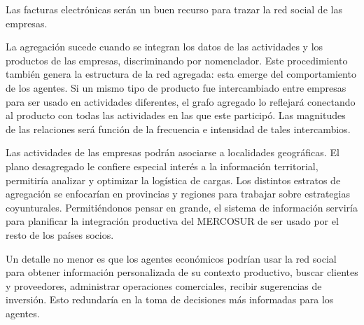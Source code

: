 \documentclass[a4paper]{report}
\begin{document}
Las facturas electrónicas serán un buen recurso para trazar la red social de las empresas.

La agregación sucede cuando se integran los datos de las actividades y los productos de las empresas, discriminando por nomenclador. Este procedimiento también genera la estructura de la red agregada: esta emerge del comportamiento de los agentes. Si un mismo tipo de producto fue intercambiado entre empresas para ser usado en actividades diferentes, el grafo agregado lo reflejará conectando al producto con todas las actividades en las que este participó. Las magnitudes de las relaciones será función de la frecuencia e intensidad de tales intercambios.

Las actividades de las empresas podrán asociarse a localidades geográficas. El plano desagregado le confiere especial interés a la información territorial, permitiría analizar y optimizar la logística de cargas. Los distintos estratos de agregación se enfocarían en provincias y regiones para trabajar sobre estrategias coyunturales. Permitiéndonos pensar en grande, el sistema de información serviría para planificar la integración productiva del MERCOSUR de ser usado por el resto de los países socios.

Un detalle no menor es que los agentes económicos podrían usar la red social para obtener información personalizada de su contexto productivo, buscar clientes y proveedores, administrar operaciones comerciales, recibir sugerencias de inversión. Esto redundaría en la toma de decisiones más informadas para los agentes.



\end{document}
